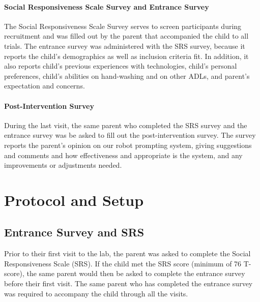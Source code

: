 \documentclass{ut-thesis}
\begin{document}
\paragraph{Social Responsiveness Scale Survey and Entrance Survey}
The Social Responsiveness Scale Survey serves to screen participants during recruitment and was filled out by the parent that accompanied the child to all trials.  The entrance survey was administered with the SRS survey, because it reports the child's demographics as well as inclusion criteria fit.  In addition, it also reports child's previous experiences with technologies, child's personal preferences, child's abilities on hand-washing and on other ADLs, and parent's expectation and concerns.

\paragraph{Post-Intervention Survey}
During the last visit, the same parent who completed the SRS survey and the entrance survey was be asked to fill out the post-intervention survey.  The survey reports the parent's opinion on our robot prompting system, giving suggestions and comments and how effectiveness and appropriate is the system, and any improvements or adjustments needed.

\section{Protocol and Setup}


\subsection{Entrance Survey and SRS}
Prior to their first visit to the lab, the parent was asked to complete the Social Responsiveness Scale (SRS). If the child met the SRS score (minimum of 76 T-score), the same parent would then be asked to complete the entrance survey before their first visit. The same parent who has completed the entrance survey was required to accompany the child through all the visits.
\end{document}

